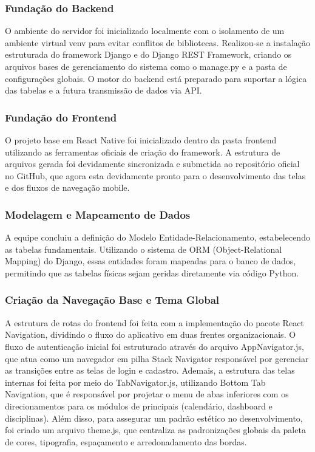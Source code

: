 \documentclass[12pt]{article}
\begin{document}
\subsubsection{Fundação do Backend}
O ambiente do servidor foi inicializado localmente com o isolamento de um ambiente virtual venv para evitar conflitos de bibliotecas. Realizou-se a instalação estruturada do framework Django e do Django REST Framework, criando os arquivos bases de gerenciamento do sistema como o manage.py e a pasta de configurações globais. O motor do backend está preparado para suportar a lógica das tabelas e a futura transmissão de dados via API.
\subsubsection{Fundação do Frontend}
O projeto base em React Native foi inicializado dentro da pasta frontend utilizando as ferramentas oficiais de criação do framework. A estrutura de arquivos gerada foi devidamente sincronizada e submetida ao repositório oficial no GitHub, que agora esta devidamente pronto para o desenvolvimento das telas e dos fluxos de navegação mobile.

\subsubsection{Modelagem e Mapeamento de Dados}
A equipe concluiu a definição do Modelo Entidade-Relacionamento, estabelecendo as tabelas fundamentais. Utilizando o sistema de ORM (Object-Relational Mapping) do Django, essas entidades foram mapeadas para o banco de dados, permitindo que as tabelas físicas sejam geridas diretamente via código Python.

\subsubsection{Criação da Navegação Base e Tema Global} 
A estrutura de rotas do frontend foi feita com a implementação do pacote React Navigation, dividindo o fluxo do aplicativo em duas frentes organizacionais. O fluxo de autenticação inicial foi estruturado através do arquivo AppNavigator.js, que atua como um navegador em pilha Stack Navigator responsável por gerenciar as transições entre as telas de login e cadastro. Ademais, a estrutura das telas internas foi feita por meio do TabNavigator.js, utilizando Bottom Tab Navigation, que é responsável por projetar o menu de abas inferiores com os direcionamentos para os módulos de principais (calendário, dashboard e disciplinas). Além disso, para assegurar um padrão estético no desenvolvimento, foi criado um arquivo theme.js, que centraliza as padronizações globais da paleta de cores, tipografia, espaçamento e arredonadamento das bordas.
\end{document}

